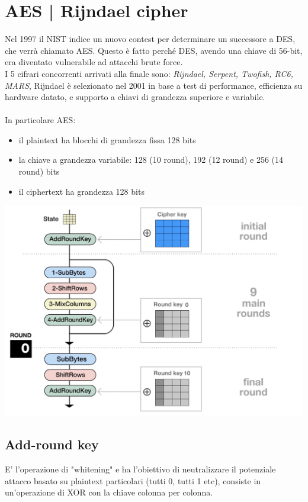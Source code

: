 \documentclass[11pt, oneside]{article}   	%
\begin{document}
\section*{AES | Rijndael cipher}
Nel 1997 il NIST indice un nuovo contest per determinare un successore a DES, che verrà chiamato AES. Questo è fatto perché DES, avendo una chiave di 56-bit, era diventato vulnerabile ad attacchi brute force.\\
I 5 cifrari concorrenti arrivati alla finale sono: \emph{Rijndael, Serpent, Twofish, RC6, MARS}, Rijndael è selezionato nel 2001 in base a test di performance, efficienza su hardware datato, e supporto a chiavi di grandezza superiore e variabile.\\\\
In particolare AES:
\begin{itemize}
\item il plaintext ha blocchi di grandezza fissa 128 bits
\item la chiave a grandezza variabile: 128 (10 round), 192 (12 round) e 256 (14 round) bits
\item il ciphertext ha grandezza 128 bits
\end{itemize}
\begin{center}
\includegraphics[scale= 0.4]{AES}
\end{center}
\subsection*{Add-round key}
E' l'operazione di "whitening" e ha l'obiettivo di neutralizzare il potenziale attacco basato su plaintext particolari (tutti 0, tutti 1 etc), consiste in un'operazione di XOR con la chiave colonna per colonna.
\end{document}

